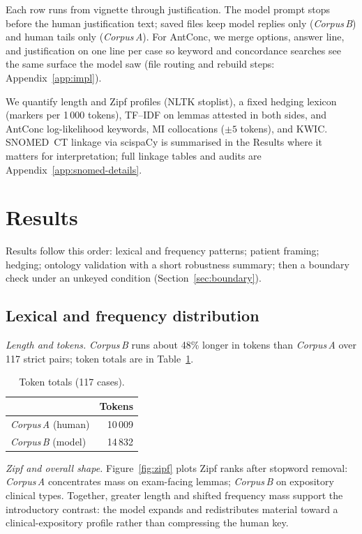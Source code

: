 \documentclass[11pt,a4paper]{article}
\newcommand{\CA}{\emph{Corpus\,A}}
\newcommand{\CB}{\emph{Corpus\,B}}
\begin{document}
Each row runs from vignette through justification. The model prompt stops before the human justification text; saved files keep model replies only (\CB) and human tails only (\CA). For AntConc, we merge options, answer line, and justification on one line per case so keyword and concordance searches see the same surface the model saw (file routing and rebuild steps: Appendix~\ref{app:impl}).

We quantify length and Zipf profiles (NLTK stoplist), a fixed hedging lexicon (markers per 1\,000 tokens), TF--IDF on lemmas attested in both sides, and AntConc log-likelihood keywords, MI collocations ($\pm 5$ tokens), and KWIC. SNOMED~CT linkage via scispaCy \cite{snomed2026,neumann2019} is summarised in the Results where it matters for interpretation; full linkage tables and audits are Appendix~\ref{app:snomed-details}.

\FloatBarrier
\section{Results}
\label{sec:results}

\noindent Results follow this order: lexical and frequency patterns; patient framing; hedging; ontology validation with a short robustness summary; then a boundary check under an unkeyed condition (Section~\ref{sec:boundary}).

\subsection{Lexical and frequency distribution}\label{sec:res-lexfreq}\label{sec:antconc}

\noindent\textit{Length and tokens.}\label{sec:res-length}\quad
\CB{} runs about 48\% longer in tokens than \CA{} over 117 strict pairs; token totals are in Table~\ref{tab:corpus-tokens}.

\begin{table}[htbp]
\centering
\small
\caption{Token totals (117 cases).}
\label{tab:corpus-tokens}
\begin{tabular}{@{}lr@{}}
\toprule
 & Tokens \\
\midrule
\CA{} (human) & 10\,009 \\
\CB{} (model) & 14\,832 \\
\bottomrule
\end{tabular}
\end{table}

\noindent\textit{Zipf and overall shape.}\quad
Figure~\ref{fig:zipf} plots Zipf ranks after stopword removal: \CA{} concentrates mass on exam-facing lemmas; \CB{} on expository clinical types. Together, greater length and shifted frequency mass support the introductory contrast: the model expands and redistributes material toward a clinical-expository profile rather than compressing the human key.
\end{document}
